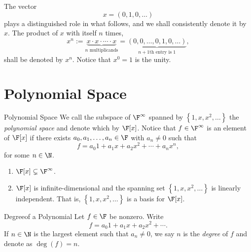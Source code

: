 \documentclass[math_245.tex]{subfiles}
\begin{document}
    \begin{remark}
        The vector
        \begin{equation*}
            x = \left( 0, 1, 0, \ldots \right)
        \end{equation*}
        plays a distinguished role in what follows, and we shall consistently denote it by $x$. The product of $x$ with itself $n$ times,
        \begin{equation*}
            x^n := \underbrace{x\cdot x\cdot\cdots\cdot x}_{n\text{ multiplicands}} = \underbrace{\left( 0, 0, \ldots, 0, 1, 0, \ldots \right)}_{n+1\text{th entry is }1}, 
        \end{equation*}
        shall be denoted by $x^n$. Notice that $x^0 = 1$ is the unity. 
    \end{remark}

    \section{Polynomial Space}

    \begin{definition}{Polynomial Space}{}
        We call the subspace of $\F^\infty$ spanned by $\left\lbrace 1, x, x^2, \ldots \right\rbrace$ the \emph{polynomial space} and denote which by $\F[x]$. Notice that $f\in \F^\infty$ is an element of $\F[x]$ if there exists $a_0, a_1, \ldots, a_n\in \F$ with $a_n\neq 0$ such that
        \begin{equation*}
            f = a_0 1+ a_1x+ a_2x^2 + \cdots + a_nx^n,
        \end{equation*}
        for some $n\in \N$.
    \end{definition}

    \begin{remark}
        \begin{enumerate}
            \item $\F[x]\subsetneq \F^\infty$.
            \item $\F[x]$ is infinite-dimensional and the spanning set $\left\lbrace 1, x, x^2, \ldots \right\rbrace$ is linearly independent. That is, $\left\lbrace 1, x, x^2, \ldots \right\rbrace$ is a basis for $\F[x]$.
        \end{enumerate}
    \end{remark}

    \begin{definition}{Degree}{of a Polynomial}
        Let $f\in \F$ be nonzero. Write
        \begin{equation*}
            f = a_0 1 + a_1x + a_2x^2 + \cdots.
        \end{equation*}
        If $n\in \N$ is the largest element such that $a_n\neq 0$, we say $n$ is the \emph{degree} of $f$ and denote as $\deg(f) = n$.
    \end{definition}
\end{document}
